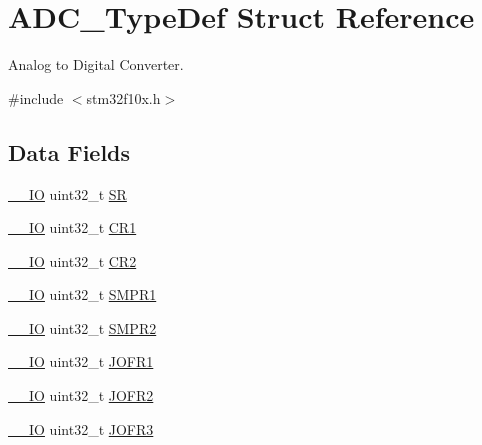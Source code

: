 \hypertarget{struct_a_d_c___type_def}{}\section{A\+D\+C\+\_\+\+Type\+Def Struct Reference}
\label{struct_a_d_c___type_def}


Analog to Digital Converter.  




{\ttfamily \#include $<$stm32f10x.\+h$>$}

\subsection*{Data Fields}
\begin{DoxyCompactItemize}
\item 
\mbox{\hyperlink{core__sc300_8h_aec43007d9998a0a0e01faede4133d6be}{\+\_\+\+\_\+\+IO}} uint32\+\_\+t \mbox{\hyperlink{struct_a_d_c___type_def_af6aca2bbd40c0fb6df7c3aebe224a360}{SR}}
\item 
\mbox{\hyperlink{core__sc300_8h_aec43007d9998a0a0e01faede4133d6be}{\+\_\+\+\_\+\+IO}} uint32\+\_\+t \mbox{\hyperlink{struct_a_d_c___type_def_ab0ec7102960640751d44e92ddac994f0}{C\+R1}}
\item 
\mbox{\hyperlink{core__sc300_8h_aec43007d9998a0a0e01faede4133d6be}{\+\_\+\+\_\+\+IO}} uint32\+\_\+t \mbox{\hyperlink{struct_a_d_c___type_def_afdfa307571967afb1d97943e982b6586}{C\+R2}}
\item 
\mbox{\hyperlink{core__sc300_8h_aec43007d9998a0a0e01faede4133d6be}{\+\_\+\+\_\+\+IO}} uint32\+\_\+t \mbox{\hyperlink{struct_a_d_c___type_def_af9d6c604e365c7d9d7601bf4ef373498}{S\+M\+P\+R1}}
\item 
\mbox{\hyperlink{core__sc300_8h_aec43007d9998a0a0e01faede4133d6be}{\+\_\+\+\_\+\+IO}} uint32\+\_\+t \mbox{\hyperlink{struct_a_d_c___type_def_a6ac83fae8377c7b7fcae50fa4211b0e8}{S\+M\+P\+R2}}
\item 
\mbox{\hyperlink{core__sc300_8h_aec43007d9998a0a0e01faede4133d6be}{\+\_\+\+\_\+\+IO}} uint32\+\_\+t \mbox{\hyperlink{struct_a_d_c___type_def_a427dda1678f254bd98b1f321d7194a3b}{J\+O\+F\+R1}}
\item 
\mbox{\hyperlink{core__sc300_8h_aec43007d9998a0a0e01faede4133d6be}{\+\_\+\+\_\+\+IO}} uint32\+\_\+t \mbox{\hyperlink{struct_a_d_c___type_def_a11e65074b9f06b48c17cdfa5bea9f125}{J\+O\+F\+R2}}
\item 
\mbox{\hyperlink{core__sc300_8h_aec43007d9998a0a0e01faede4133d6be}{\+\_\+\+\_\+\+IO}} uint32\+\_\+t \mbox{\hyperlink{struct_a_d_c___type_def_a613f6b76d20c1a513976b920ecd7f4f8}{J\+O\+F\+R3}}

\end{DoxyCompactItemize}
